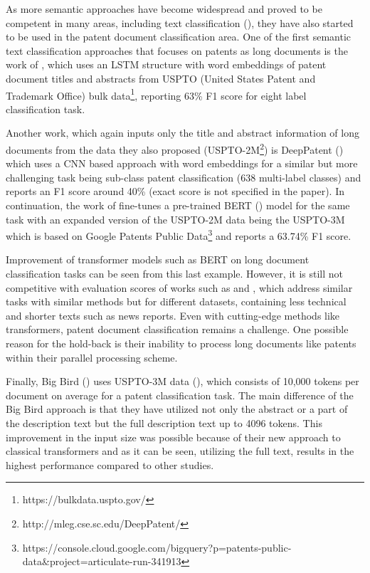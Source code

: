 \documentclass{iyte}
\begin{document}


As more semantic approaches have become widespread and proved to be competent in many areas, including text classification (\citealt{semantic_text_classification}), they have also started to be used in the patent document classification area. One of the first semantic text classification approaches that focuses on patents as long documents is the work of \cite{Grawe-word-embedding}, which uses an LSTM structure with word embeddings of patent document titles and abstracts from USPTO (United States Patent and Trademark Office) bulk data\footnote{https://bulkdata.uspto.gov/}, reporting 63\% F1 score for eight label classification task.

Another work, which again inputs only the title and abstract information of long documents from the data they also proposed (USPTO-2M\footnote{http://mleg.cse.sc.edu/DeepPatent/}) is DeepPatent (\citealt{DeepPatent}) which uses a CNN based approach with word embeddings for a similar but more challenging task being sub-class patent classification (638 multi-label classes) and reports an F1 score around 40\% (exact score is not specified in the paper). In continuation, the work of \cite{Lee-BERT} fine-tunes a pre-trained BERT (\citealt{BERT}) model for the same task with an expanded version of the USPTO-2M data being the USPTO-3M which is based on Google Patents Public Data\footnote{https://console.cloud.google.com/bigquery?p=patents-public-data\&project=articulate-run-341913} and reports a 63.74\% F1 score.

Improvement of transformer models such as BERT on long document classification tasks can be seen from this last example. However, it is still not competitive with evaluation scores of works such as \cite{single-label-BERT} and \cite{multi-label-BERT}, which address similar tasks with similar methods but for different datasets, containing less technical and shorter texts such as news reports. Even with cutting-edge methods like transformers, patent document classification remains a challenge. One possible reason for the hold-back is their inability to process long documents like patents within their parallel processing scheme.

Finally, Big Bird (\citealt{BigBird}) uses USPTO-3M data (\citealt{Lee-BERT}), which consists of 10,000 tokens per document on average for a patent classification task. The main difference of the Big Bird approach is that they have utilized not only the abstract or a part of the description text but the full description text up to 4096 tokens. This improvement in the input size was possible because of their new approach to classical transformers and as it can be seen, utilizing the full text, results in the highest performance compared to other studies.
\end{document}
